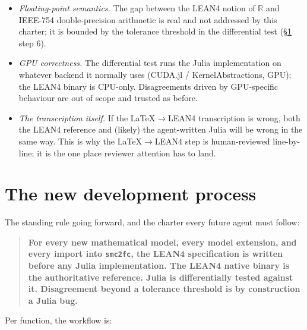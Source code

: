\documentclass[11pt,a4paper]{article}
\begin{document}
\begin{itemize}
\item \emph{Floating-point semantics.} The gap between the LEAN4
  notion of $\mathbb{R}$ and IEEE-754 double-precision arithmetic
  is real and not addressed by this charter; it is bounded by the
  tolerance threshold in the differential test (§\ref{sec:process}
  step 6).
\item \emph{GPU correctness.} The differential test runs the
  Julia implementation on whatever backend it normally uses
  (CUDA.jl / KernelAbstractions, GPU); the LEAN4 binary is
  CPU-only. Disagreements driven by GPU-specific behaviour are
  out of scope and trusted as before.
\item \emph{The transcription itself.} If the LaTeX$\to$LEAN4
  transcription is wrong, both the LEAN4 reference and (likely)
  the agent-written Julia will be wrong in the same way. This is
  why the LaTeX$\to$LEAN4 step is human-reviewed line-by-line; it
  is the one place reviewer attention has to land.
\end{itemize}

\section{The new development process}
\label{sec:process}

The standing rule going forward, and the charter every future
agent must follow:

\begin{quote}\bfseries
For every new mathematical model, every model extension, and every
import into \texttt{smc2fc}, the LEAN4 specification is written
before any Julia implementation. The LEAN4 native binary is the
authoritative reference. Julia is differentially tested against
it. Disagreement beyond a tolerance threshold is by construction a
Julia bug.
\end{quote}

Per function, the workflow is:
\end{document}
